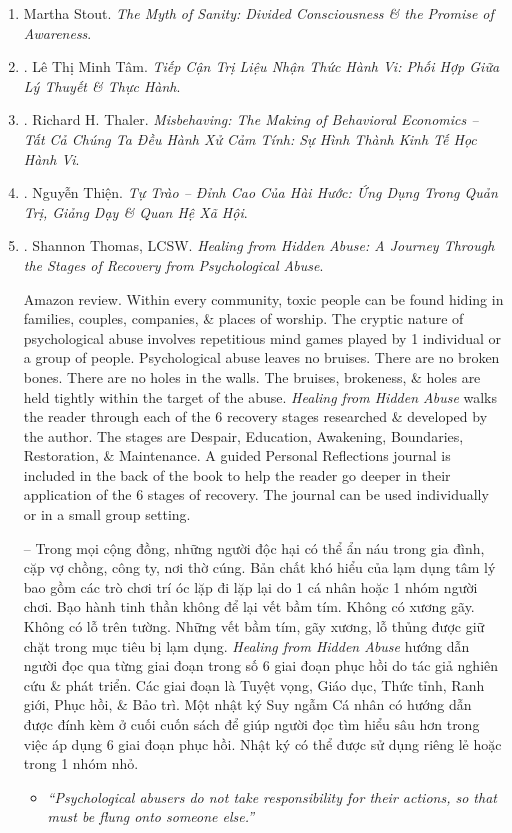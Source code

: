 \documentclass{article}
\begin{document}
\begin{enumerate}
	\item {\sc Martha Stout}. {\it The Myth of Sanity: Divided Consciousness \& the Promise of Awareness}.

    \item \cite{Tam_tri_lieu_nhan_thuc_hanh_vi}. {\sc Lê Thị Minh Tâm}. {\it Tiếp Cận Trị Liệu Nhận Thức Hành Vi: Phối Hợp Giữa Lý Thuyết \& Thực Hành}.\hfill{\sf[done]}

	\item \cite{Thaler_misbehaving_VN}. Richard H. Thaler. {\it Misbehaving: The Making of Behavioral Economics -- Tất Cả Chúng Ta Đều Hành Xử Cảm Tính: Sự Hình Thành Kinh Tế Học Hành Vi}.\hfill{\sf[reading]}

	\item \cite{Thien_tu_trao}. {\sc Nguyễn Thiện.} {\it Tự Trào -- Đỉnh Cao Của Hài Hước: Ứng Dụng Trong Quản Trị, Giảng Dạy \& Quan Hệ Xã Hội}.\hfill{\sf[done]}

	\item \cite{Thomas_psychological_manipulation}. {\sc Shannon Thomas, LCSW}. {\it Healing from Hidden Abuse: A Journey Through the Stages of Recovery from Psychological Abuse}. {}

	{\sf Amazon review.} Within every community, toxic people can be found hiding in families, couples, companies, \& places of worship. The cryptic nature of psychological abuse involves repetitious mind games played by 1 individual or a group of people. Psychological abuse leaves no bruises. There are no broken bones. There are no holes in the walls. The bruises, brokeness, \& holes are held tightly within the target of the abuse. {\it Healing from Hidden Abuse} walks the reader through each of the 6 recovery stages researched \& developed by the author. The stages are Despair, Education, Awakening, Boundaries, Restoration, \& Maintenance. A guided Personal Reflections journal is included in the back of the book to help the reader go deeper in their application of the 6 stages of recovery. The journal can be used individually or in a small group setting.

	-- Trong mọi cộng đồng, những người độc hại có thể ẩn náu trong gia đình, cặp vợ chồng, công ty, nơi thờ cúng. Bản chất khó hiểu của lạm dụng tâm lý bao gồm các trò chơi trí óc lặp đi lặp lại do 1 cá nhân hoặc 1 nhóm người chơi. Bạo hành tinh thần không để lại vết bầm tím. Không có xương gãy. Không có lỗ trên tường. Những vết bầm tím, gãy xương, lỗ thủng được giữ chặt trong mục tiêu bị lạm dụng. {\it Healing from Hidden Abuse} hướng dẫn người đọc qua từng giai đoạn trong số 6 giai đoạn phục hồi do tác giả nghiên cứu \& phát triển. Các giai đoạn là Tuyệt vọng, Giáo dục, Thức tỉnh, Ranh giới, Phục hồi, \& Bảo trì. Một nhật ký Suy ngẫm Cá nhân có hướng dẫn được đính kèm ở cuối cuốn sách để giúp người đọc tìm hiểu sâu hơn trong việc áp dụng 6 giai đoạn phục hồi. Nhật ký có thể được sử dụng riêng lẻ hoặc trong 1 nhóm nhỏ.
	\begin{itemize}
		\item {\it``Psychological abusers do not take responsibility for their actions, so that must be flung onto someone else.''}


\end{itemize}
\end{enumerate}
\end{document}
